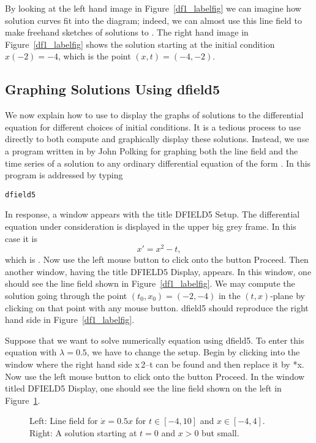 \documentclass{ximera}
\begin{document}
By looking at the left hand image in Figure~\ref{df1_labelfig}
we can imagine how solution curves fit into the diagram; indeed,
we can almost use this line field to make freehand sketches
of solutions to .  The right hand image in
Figure~\ref{df1_labelfig} shows the solution starting at the
initial condition $x(-2) = -4$, which is the point $(x,t)=(-4,-2)$.


\subsection*{Graphing Solutions Using {\sf dfield5}}

We now explain how to use \Matlab to display the graphs of
solutions to the differential equation  for different
choices of initial conditions.  It is a tedious process to use
\Matlab directly to both compute and graphically display these
solutions.  Instead, we use a program written in \Matlab by John
Polking for graphing both the line field and the time 
series of a solution to any ordinary differential equation of the form
.  In \Matlab this program is addressed by typing
\begin{verbatim}
dfield5
\end{verbatim}
In response, a window appears with the title {\sf
DFIELD5 Setup.}  The differential equation under consideration is 
displayed in the upper big grey frame.  In this case it is
\[
	x' = x^2 - t,
\]
which is .  Now use the left 
mouse button to click onto the button {\sf Proceed}.  
Then another window, having the title {\sf DFIELD5 Display},
appears.  In this window, one should see the line
field shown in Figure~\ref{df1_labelfig}.  We may compute the
solution going through the point $(t_0,x_0)=(-2,-4)$ in the
$(t,x)$-plane by clicking on that point with any mouse button.
{\sf dfield5} should reproduce the right hand side in
Figure~\ref{df1_labelfig}.

Suppose that we want to solve numerically equation 
using {\sf dfield5}. To enter this equation with $\lambda = 0.5$,
we have to change the setup.  Begin by clicking into the window
where the right hand side {\sf x\^{$\,\!$}2--t} can be found and
then replace it by {*x}.  Now use the left mouse button
to click onto the button {\sf Proceed}.  In the window titled
{\sf DFIELD5 Display}, one should see the line field
 shown on
the left in Figure~\ref{df_dsp1}.
\begin{figure}[htb]
    \centerline{%
    }
    \caption{Left: Line field for $\dot{x}=0.5x$ for $t\in [-4,10]$ and
		$x\in [-4,4]$.  Right: A solution starting at $t=0$ and
		$x>0$ but small.}
    \label{df_dsp1}
\end{figure}
\end{document}
